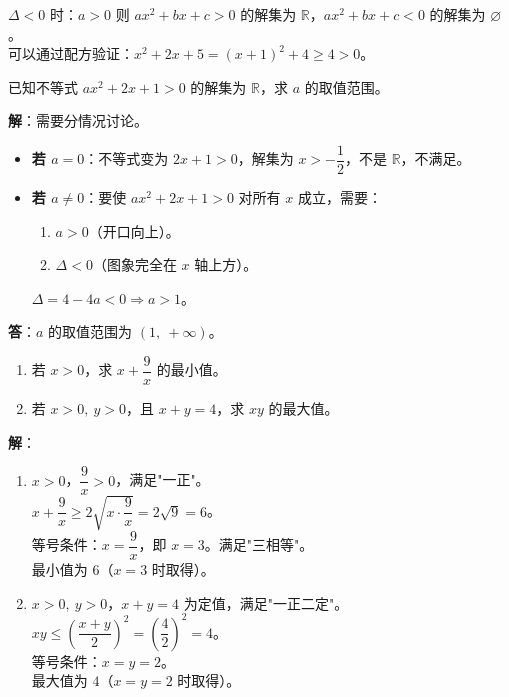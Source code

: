 \documentclass[12pt, a4paper]{ctexart}
\begin{document}
\begin{tipbox}[方法总结]
$\Delta < 0$ 时：$a > 0$ 则 $ax^2 + bx + c > 0$ 的解集为 $\mathbb{R}$，$ax^2 + bx + c < 0$ 的解集为 $\varnothing$。\\
可以通过配方验证：$x^2 + 2x + 5 = (x+1)^2 + 4 \geq 4 > 0$。
\end{tipbox}

\begin{examplebox}[【例4】含参数的一元二次不等式]
已知不等式 $ax^2 + 2x + 1 > 0$ 的解集为 $\mathbb{R}$，求 $a$ 的取值范围。
\end{examplebox}

\textbf{解}：需要分情况讨论。
\begin{itemize}[leftmargin=2em]
  \item \textbf{若 $a = 0$}：不等式变为 $2x + 1 > 0$，解集为 $x > -\dfrac{1}{2}$，不是 $\mathbb{R}$，不满足。
  \item \textbf{若 $a \neq 0$}：要使 $ax^2 + 2x + 1 > 0$ 对所有 $x$ 成立，需要：
    \begin{enumerate}[leftmargin=2em]
      \item $a > 0$（开口向上）。
      \item $\Delta < 0$（图象完全在 $x$ 轴上方）。
    \end{enumerate}
    $\Delta = 4 - 4a < 0 \Rightarrow a > 1$。
\end{itemize}
\textbf{答}：$a$ 的取值范围为 $\boxed{(1,\ +\infty)}$。

\begin{examplebox}[【例5】利用基本不等式求最值]
\begin{enumerate}[label=(\arabic*)]
  \item 若 $x > 0$，求 $x + \dfrac{9}{x}$ 的最小值。
  \item 若 $x > 0,\ y > 0$，且 $x + y = 4$，求 $xy$ 的最大值。
\end{enumerate}
\end{examplebox}

\textbf{解}：
\begin{enumerate}[label=(\arabic*)]
  \item $x > 0$，$\dfrac{9}{x} > 0$，满足"一正"。\\
    $x + \dfrac{9}{x} \geq 2\sqrt{x \cdot \dfrac{9}{x}} = 2\sqrt{9} = 6$。\\
    等号条件：$x = \dfrac{9}{x}$，即 $x = 3$。满足"三相等"。\\
    最小值为 $\boxed{6}$（$x = 3$ 时取得）。
  \item $x > 0,\ y > 0$，$x + y = 4$ 为定值，满足"一正二定"。\\
    $xy \leq \left(\dfrac{x+y}{2}\right)^2 = \left(\dfrac{4}{2}\right)^2 = 4$。\\
    等号条件：$x = y = 2$。\\
    最大值为 $\boxed{4}$（$x = y = 2$ 时取得）。
\end{enumerate}
\end{document}
